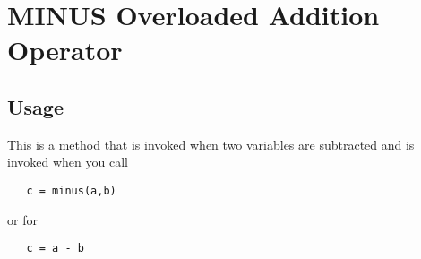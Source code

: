 \section{MINUS Overloaded Addition Operator}

\subsection{Usage}

This is a method that is invoked when two variables are subtracted
and is invoked when you call
\begin{verbatim}
   c = minus(a,b)
\end{verbatim}
or for
\begin{verbatim}
   c = a - b
\end{verbatim}
